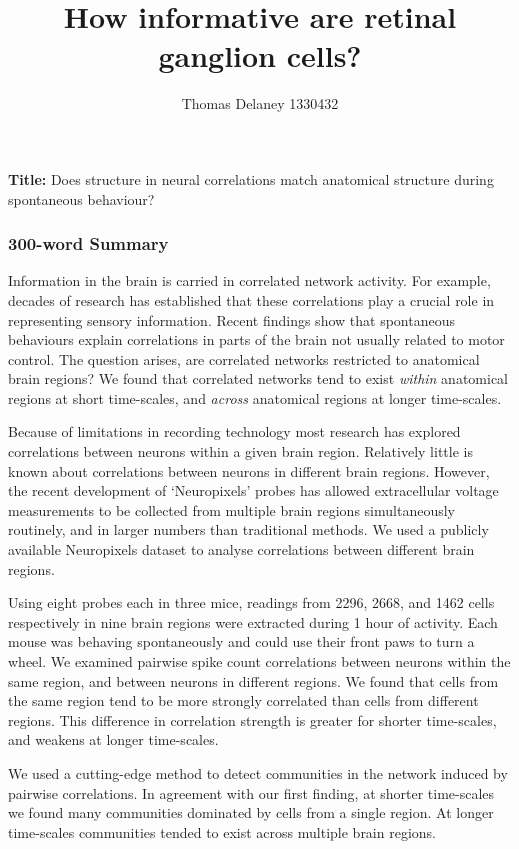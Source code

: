 \documentclass[a4paper,12pt]{article}
\title{How informative are retinal ganglion cells?}
\author{Thomas Delaney 1330432}
\theoremstyle{definition}
\begin{document}
\noindent
\textbf{Title:} Does structure in neural correlations match anatomical structure during spontaneous behaviour?
\vspace{-0.5cm}
\subsubsection*{300-word Summary}
\vspace{-0.3cm}
Information in the brain is carried in correlated network activity. For example, decades of research has established that these correlations play a crucial role in representing sensory information\cite{cohen1}. Recent findings show that spontaneous behaviours explain correlations in parts of the brain not usually related to motor control\cite{stringer}. The question arises, are correlated networks restricted to anatomical brain regions? We found that correlated networks tend to exist \textit{within} anatomical regions at short time-scales, and \textit{across} anatomical regions at longer time-scales.

Because of limitations in recording technology most research has explored correlations between neurons within a given brain region. Relatively little is known about correlations between neurons in different brain regions. However, the recent development of `Neuropixels' probes\cite{jun} has allowed extracellular voltage measurements to be collected from multiple brain regions simultaneously routinely, and in larger numbers than traditional methods. We used a publicly available Neuropixels dataset to analyse correlations between different brain regions.

Using eight probes each in three mice, readings from 2296, 2668, and 1462 cells respectively in nine brain regions were extracted during 1 hour of activity. Each mouse was behaving spontaneously and could use their front paws to turn a wheel\cite{stringer}. We examined pairwise spike count correlations between neurons within the same region, and between neurons in different regions. We found that cells from the same region tend to be more strongly correlated than cells from different regions. This difference in correlation strength is greater for shorter time-scales, and weakens at longer time-scales. 

We used a cutting-edge method\cite{humphries} to detect communities in the network induced by pairwise correlations. In agreement with our first finding, at shorter time-scales we found many communities dominated by cells from a single region. At longer time-scales communities tended to exist across multiple brain regions. 
\end{document}
